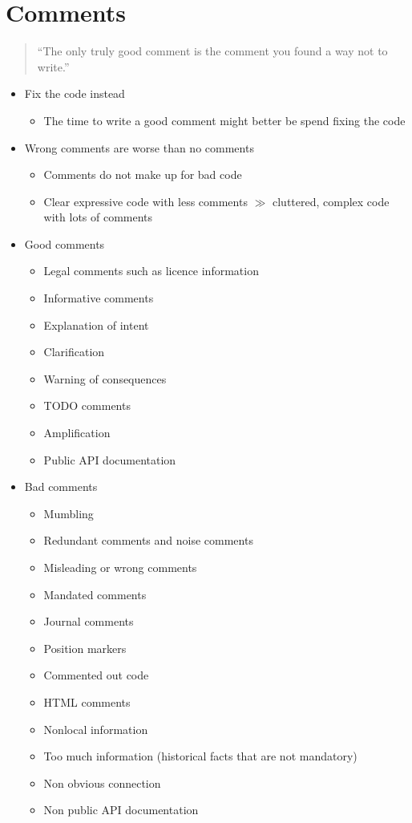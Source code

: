 \section{Comments}
\begin{quote}
    ``The only truly good comment is the comment you found a way not to write.''
\end{quote}
\begin{itemize}
    \item Fix the code instead
    \begin{itemize}
        \item The time to write a good comment might better be spend fixing the code
    \end{itemize}
    \item Wrong comments are worse than no comments
    \begin{itemize}
        \item Comments do not make up for bad code
        \item Clear expressive code with less comments $\gg$ cluttered, complex code with lots of comments
    \end{itemize}
    \item Good comments
    \begin{itemize}
        \item Legal comments such as licence information
        \item Informative comments
        \item Explanation of intent
        \item Clarification
        \item Warning of consequences
        \item TODO comments
        \item Amplification
        \item Public API documentation
    \end{itemize}
    \item Bad comments
    \begin{itemize}
        \item Mumbling
        \item Redundant comments and noise comments
        \item Misleading or wrong comments
        \item Mandated comments
        \item Journal comments
        \item Position markers
        \item Commented out code
        \item HTML comments
        \item Nonlocal information
        \item Too much information (historical facts that are not mandatory)
        \item Non obvious connection
        \item Non public API documentation
    \end{itemize}
\end{itemize}
